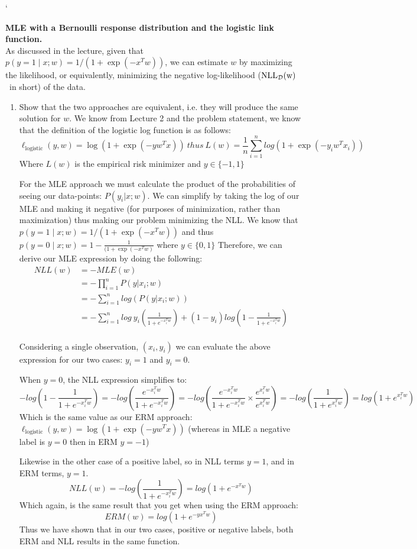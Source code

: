 `\documentclass{article}
\newcommand{\nll}{\rm NLL}
\theoremstyle{plain}
\theoremstyle{definition}
\begin{document}
\textbf{MLE with a Bernoulli response distribution and the logistic link function.}\\
As discussed in the lecture, given that
$p(y=1 \mid x; w) = 1 / (1 + \exp(-x^Tw))$,
we can estimate $w$ by maximizing the likelihood, or equivalently,
minimizing the negative log-likelihood ($\nll_{\mathcal{D}}(w)$~in short) of the data.

\begin{enumerate}
  \setcounter{enumi}{\value{saveenum}}
  \item Show that the two approaches are equivalent, i.e. they will produce the same solution for $w$.
  \subitem
  We know from Lecture 2 and the problem statement, we know that the definition of the logistic log function is as follows:
$$\ell_{\text{logistic}}(y, w)=\log\left(1+\exp(-yw^Tx)\right) \ thus \ L(w) = \frac{1}{n}\sum_{i=1}^n log\left(1+\exp(-y_iw^Tx_i)\right)$$
Where $L(w)$ is the empirical risk minimizer and $y\in \{-1,1\}$

For the MLE approach we must calculate the product of the probabilities of seeing our data-points: $P(y_i|x;w)$. We can simplify by taking the log of our MLE and making it negative (for purposes of minimization, rather than maximization) thus making our problem minimizing the NLL. We know that $p(y=1 \mid x; w) = 1 / (1 + \exp(-x^Tw))$ and thus $p(y=0 \mid x; w) = 1 - \frac{1}{(1 + \exp(-x^Tw)}$ where $y \in \{ 0,1\}$ 
Therefore, we can derive our MLE expression by doing the following:
\begin{equation}
    \begin{split}
        NLL(w) &= -MLE(w) \\
        &= -\prod_{i=1}^n P(y|x_i;w) \\
        &=-\sum_{i=1}^n log(P(y|x_i;w)) \\
        &= -\sum_{i=1}^n  log \ y_i\left( \frac{1}{1+e^{-x_i^Tw}} \right) + (1-y_i)log \left(1 -  \frac{1}{1+e^{-x_i^Tw}} \right) \\
    \end{split}
\end{equation}

Considering a single observation, $(x_i,y_i)$ we can evaluate the above expression for our two cases: $y_i=1$ and $y_i=0$.

When $y=0$, the NLL expression simplifies to:
$$
    -log(1-\frac{1}{1+e^{-x_i^Tw}}) = -log(\frac{e^{-x_i^Tw}}{1+e^{-x_i^Tw}}) =-log(\frac{e^{-x_i^Tw}}{1+e^{-x_i^Tw}} \times \frac{e^{x_i^Tw}}{e^{x_i^Tw}}) = -log(\frac{1}{1+e^{x_i^Tw}}) = log(1+e^{x_i^Tw})
$$
Which is the same value as our ERM approach: $\ell_{\text{logistic}}(y, w)=\log\left(1+\exp(-yw^Tx)\right)$ (whereas in MLE a negative label is $y=0$ then in ERM $y =-1$)

Likewise in the other case of a positive label, so in NLL terms $y=1$, and in ERM terms, $y=1$. 
$$
    NLL(w) = -log(\frac{1}{1+e^{-x_i^Tw}}) = log(1+e^{-x^Tw})
$$
Which again, is the same result that you get when using the ERM approach:
$$
    ERM(w) = log(1+e^{-yx^Tw})
$$
Thus we have shown that in our two cases, positive or negative labels, both ERM and NLL results in the same function.



\setcounter{saveenum}{\value{enumi}}
\end{enumerate}
\end{document}
